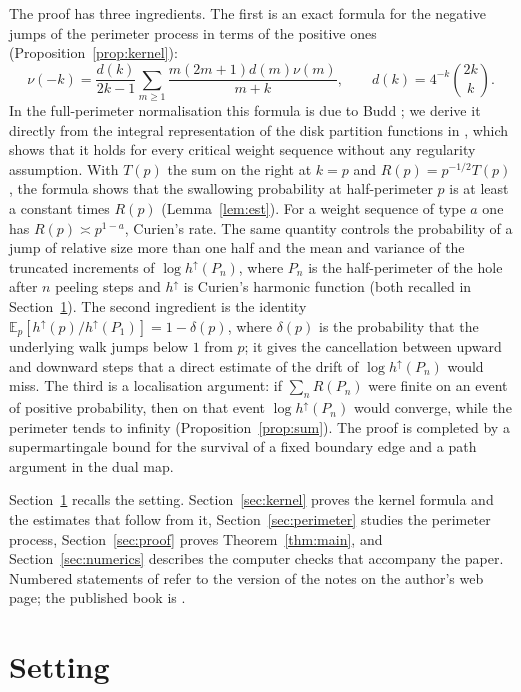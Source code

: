\documentclass[11pt]{amsart}
\theoremstyle{remark}
\numberwithin{equation}{section}
\newcommand{\E}{\mathbb E}
\newcommand{\1}{\mathbf 1}
\begin{document}
The proof has three ingredients. The first is an exact formula for the negative jumps of the perimeter process in terms of the positive ones (Proposition~\ref{prop:kernel}):
\[
\nu(-k)=\frac{d(k)}{2k-1}\sum_{m\ge1}\frac{m(2m+1)d(m)\nu(m)}{m+k},\qquad d(k)=4^{-k}\binom{2k}k .
\]
In the full-perimeter normalisation this formula is due to Budd \cite[Lemma~4 and Section~6]{Bud}; we derive it directly from the integral representation of the disk partition functions in \cite{Cur}, which shows that it holds for every critical weight sequence without any regularity assumption. With $T(p)$ the sum on the right at $k=p$ and $R(p)=p^{-1/2}T(p)$, the formula shows that the swallowing probability at half-perimeter $p$ is at least a constant times $R(p)$ (Lemma~\ref{lem:est}). For a weight sequence of type $a$ one has $R(p)\asymp p^{1-a}$, Curien's rate. The same quantity controls the probability of a jump of relative size more than one half and the mean and variance of the truncated increments of $\log h^\uparrow(P_n)$, where $P_n$ is the half-perimeter of the hole after $n$ peeling steps and $h^\uparrow$ is Curien's harmonic function (both recalled in Section~\ref{sec:setup}). The second ingredient is the identity $\E_p[h^\uparrow(p)/h^\uparrow(P_1)]=1-\delta(p)$, where $\delta(p)$ is the probability that the underlying walk jumps below $1$ from $p$; it gives the cancellation between upward and downward steps that a direct estimate of the drift of $\log h^\uparrow(P_n)$ would miss. The third is a localisation argument: if $\sum_nR(P_n)$ were finite on an event of positive probability, then on that event $\log h^\uparrow(P_n)$ would converge, while the perimeter tends to infinity (Proposition~\ref{prop:sum}). The proof is completed by a supermartingale bound for the survival of a fixed boundary edge and a path argument in the dual map.

Section~\ref{sec:setup} recalls the setting. Section~\ref{sec:kernel} proves the kernel formula and the estimates that follow from it, Section~\ref{sec:perimeter} studies the perimeter process, Section~\ref{sec:proof} proves Theorem~\ref{thm:main}, and Section~\ref{sec:numerics} describes the computer checks that accompany the paper. Numbered statements of \cite{Cur} refer to the version of the notes on the author's web page; the published book is \cite{CurLNM}.

\section{Setting}\label{sec:setup}
\end{document}
